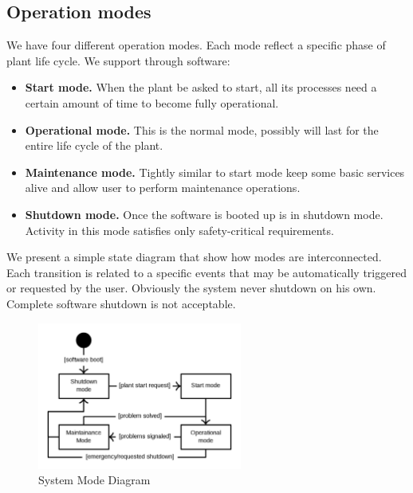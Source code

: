 \documentclass[10pt,a4paper]{report}
\begin{document}
\subsection{Operation modes}
We have four different operation modes. Each mode reflect a specific 
phase of plant life cycle. We support through software:
\begin{itemize}
    \item \textbf{Start mode.} When the plant be asked to start, all its 
    processes need a certain amount of time to become fully operational.
    \item \textbf{Operational mode.} This is the normal mode, possibly will
    last for the entire life cycle of the plant. 
    \item \textbf{Maintenance mode.} Tightly similar to start mode keep 
    some basic services alive and allow user to perform maintenance operations.
    \item \textbf{Shutdown mode.} Once the software is booted up is in 
    shutdown mode. Activity in this mode satisfies only safety-critical 
    requirements.
\end{itemize}
We present a simple state diagram that show how modes are interconnected. 
Each transition is related to a specific events that may be automatically
triggered or requested by the user. Obviously the system never shutdown on his
own. Complete software shutdown is not acceptable.
\begin{figure}[htb]
\centering
\includegraphics[width=0.6\textwidth]{diagrams/OpModes}
\caption{System Mode Diagram}
\end{figure}
\end{document}
